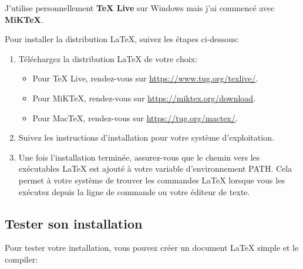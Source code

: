 J'utilise personnellement \textbf{TeX Live} sur Windows mais j'ai commencé avec \textbf{MiKTeX}.

Pour installer la distribution LaTeX, suivez les étapes ci-dessous:

\begin{enumerate}
    \item Téléchargez la distribution LaTeX de votre choix:
    \begin{itemize}
        \item Pour TeX Live, rendez-vous sur \href{https://www.tug.org/texlive/}{\url{https://www.tug.org/texlive/}}.
        \item Pour MiKTeX, rendez-vous sur \href{https://miktex.org/download}{\url{https://miktex.org/download}}.
        \item Pour MacTeX, rendez-vous sur \href{https://tug.org/mactex/}{\url{https://tug.org/mactex/}}.
    \end{itemize}
    \item Suivez les instructions d'installation pour votre système d'exploitation.
    \item Une fois l'installation terminée, assurez-vous que le chemin vers les exécutables LaTeX est ajouté à votre variable d'environnement PATH.\@
    Cela permet à votre système de trouver les commandes LaTeX lorsque vous les exécutez depuis la ligne de commande ou votre éditeur de texte.
\end{enumerate}

\subsection{Tester son installation}\label{subsec:test_installation}

Pour tester votre installation, vous pouvez créer un document LaTeX simple et le compiler:

